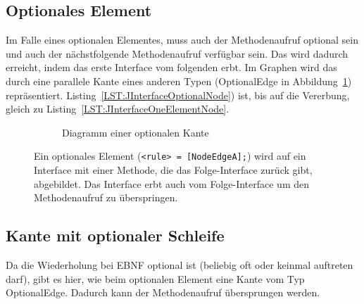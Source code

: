 \documentclass[../InterneDSLs.tex]{subfiles}
\begin{document}
\subsection{Optionales Element}\label{SEC:Optional}
Im Falle eines optionalen Elementes, muss auch der Methodenaufruf optional sein und auch der nächstfolgende Methodenaufruf verfügbar sein. Das wird dadurch erreicht, indem das erste Interface vom folgenden erbt. Im Graphen wird das durch eine parallele Kante eines anderen Typen (OptionalEdge in Abbildung~\ref{FIG:DiagramOptionalNode}) repräsentiert. Listing~\ref{LST:JInterfaceOptionalNode}) ist, bis auf die Vererbung, gleich zu Listing~\ref{LST:JInterfaceOneElementNode}.
\begin{figure}[ht]
\centering
  \begin{subfigure}[c]{0.49\textwidth}
    \caption{Diagramm einer optionalen Kante}
    \label{FIG:DiagramOptionalNode}
  \end{subfigure}
  \begin{subfigure}[c]{0.49\textwidth}
    
  \end{subfigure}
  \caption[Abbildung eines optionalen Elements (\texttt{<rule> = [NodeEdgeA];})]{Ein optionales Element (\texttt{<rule> = [NodeEdgeA];}) wird auf ein Interface mit einer Methode, die das Folge-Interface zurück gibt, abgebildet. Das Interface erbt auch vom Folge-Interface um den Methodenaufruf zu überspringen.}
  \label{FIG:OptionalNode}
\end{figure}

\subsection{Kante mit optionaler Schleife}\label{SEC:OptionalLoop}
Da die Wiederholung bei EBNF optional ist (beliebig oft oder keinmal auftreten darf), gibt es hier, wie beim optionalen Element eine Kante vom Typ OptionalEdge. Dadurch kann der Methodenaufruf übersprungen werden.
\end{document}
